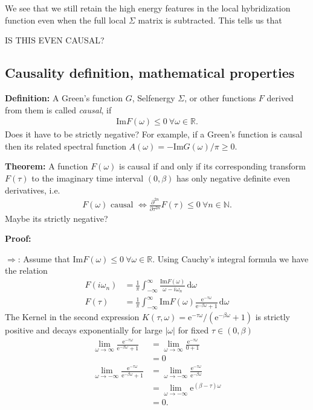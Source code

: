 \documentclass[12pt,a4paper]{scrartcl}
\numberwithin{equation}{section}
\newcommand{\cng}[1]{{\color{red}#1}}
\begin{document}
We see that we still retain the high energy features in the local
hybridization function even when the full local $\Sigma$ matrix is subtracted.
This tells us that 

\cng{IS THIS EVEN CAUSAL?}



\subsection{Causality definition, mathematical properties}

\textbf{Definition:}
A Green's function $G$, Selfenergy $\Sigma$, or other functions $F$ derived from them
is called \textit{causal}, if 
\begin{align}
\mathrm{Im}F(\omega) \leq 0 \  \forall \omega \in \mathbb{R}.
\end{align}
\cng{Does it have to be strictly negative? }
For example, if a Green's function is causal then its related
spectral function $A(\omega) = -\mathrm{Im}G(\omega)/\pi \geq 0$.

\textbf{Theorem:}
A function $F(\omega)$ is causal if and only if its corresponding
transform $F(\tau)$ to the imaginary time interval $(0,\beta)$
has only negative definite even derivatives, i.e.
\begin{align}
F(\omega) \mbox{ causal }
%
\Leftrightarrow
%
\frac{\partial^{2n} }{\partial \tau^{2n}} F(\tau) \leq 0 \ \forall n\in\mathbb{N}.
\end{align}
\cng{Maybe its strictly negative?}

\textbf{Proof:}

$\Rightarrow$: Assume that $\mathrm{Im}F(\omega) \leq 0 \  \forall \omega \in \mathbb{R}$.
Using Cauchy's integral formula we have the relation
\begin{align}
F(i\omega_n) &= \frac{1}{\pi} \int_{-\infty}^{\infty} 
                \frac{\mathrm{Im}F(\omega)}{\omega - i\omega_n}\, \mathrm{d}\omega\\
%
F(\tau) &= \frac{1}{\pi} \int_{-\infty}^{\infty} 
          \mathrm{Im}F(\omega) \frac{\mathrm{e}^{-\tau\omega}}{\mathrm{e}^{-\beta\omega}+1}
          \, \mathrm{d}\omega                
\end{align}
The Kernel in the second expression 
$K(\tau,\omega) = \mathrm{e}^{-\tau\omega}/ \left( \mathrm{e}^{-\beta\omega}+1 \right)$
is strictly positive and  decays exponentially for
large $|\omega|$ for fixed $\tau\in (0,\beta)$
\begin{align}
\lim\limits_{\omega\rightarrow \infty} 
 \frac{\mathrm{e}^{-\tau\omega}}{\mathrm{e}^{-\beta\omega}+1}  
 &= \lim\limits_{\omega\rightarrow \infty} 
 \frac{\mathrm{e}^{-\tau\omega}}{0+1} \\
  &= 0 \\
 \lim\limits_{\omega\rightarrow -\infty} 
 \frac{\mathrm{e}^{-\tau\omega}}{\mathrm{e}^{-\beta\omega}+1}  
 &= \lim\limits_{\omega\rightarrow -\infty} 
 \frac{\mathrm{e}^{-\tau\omega}}{\mathrm{e}^{-\beta\omega}}   \\
 &= \lim\limits_{\omega\rightarrow -\infty} 
\mathrm{e}^{(\beta-\tau)\omega} \\
&= 0.
\end{align}
\end{document}
